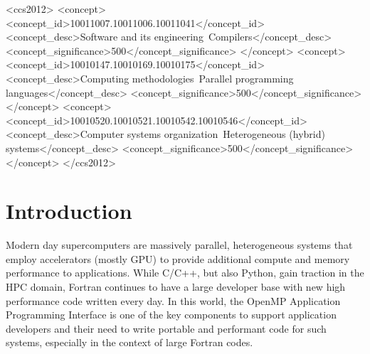 \documentclass[acmtog,natbib=false]{acmart}
\begin{document}
\begin{CCSXML}
<ccs2012>
   <concept>
       <concept_id>10011007.10011006.10011041</concept_id>
       <concept_desc>Software and its engineering~Compilers</concept_desc>
       <concept_significance>500</concept_significance>
       </concept>
   <concept>
       <concept_id>10010147.10010169.10010175</concept_id>
       <concept_desc>Computing methodologies~Parallel programming languages</concept_desc>
       <concept_significance>500</concept_significance>
       </concept>
   <concept>
       <concept_id>10010520.10010521.10010542.10010546</concept_id>
       <concept_desc>Computer systems organization~Heterogeneous (hybrid) systems</concept_desc>
       <concept_significance>500</concept_significance>
       </concept>
 </ccs2012>
\end{CCSXML}



\maketitle


\section{Introduction}
\label{sec:Introduction}

Modern day supercomputers are massively parallel, heterogeneous systems that employ accelerators (mostly GPU) to provide additional compute and memory performance to applications.
While C/C++, but also Python, gain traction in the HPC domain, Fortran continues to have a large developer base with new high performance code written every day.
In this world, the OpenMP Application Programming Interface is one of the key components to support application developers and their need to write portable and performant code for such systems, especially in the context of large Fortran codes.  
\end{document}
